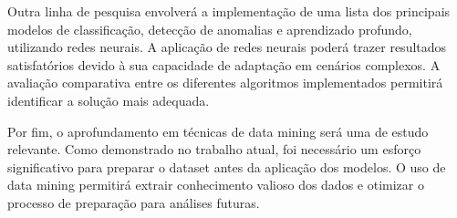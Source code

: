 \documentclass[12pt,a4paper]{article}
\begin{document}
Outra linha de pesquisa envolver\'a a implementa\c{c}\~{a}o de uma lista dos principais modelos de classifica\c{c}\~{a}o, detec\c{c}\~{a}o de anomalias e aprendizado profundo, utilizando redes neurais. A aplica\c{c}\~{a}o de redes neurais poder\'a trazer resultados satisfat\'orios devido \`a sua capacidade de adapta\c{c}\~{a}o em cen\'arios complexos. A avalia\c{c}\~{a}o comparativa entre os diferentes algoritmos implementados permitir\'a identificar a solu\c{c}\~{a}o mais adequada.

Por fim, o aprofundamento em t\'ecnicas de data mining ser\'a uma  de estudo relevante. Como demonstrado no trabalho atual, foi necess\'ario um esfor\c{c}o significativo para preparar o dataset antes da aplica\c{c}\~{a}o dos modelos. O uso de data mining permitir\'a extrair conhecimento valioso dos dados e otimizar o processo de prepara\c{c}\~{a}o para an\'alises futuras.


\newpage

\end{document}
